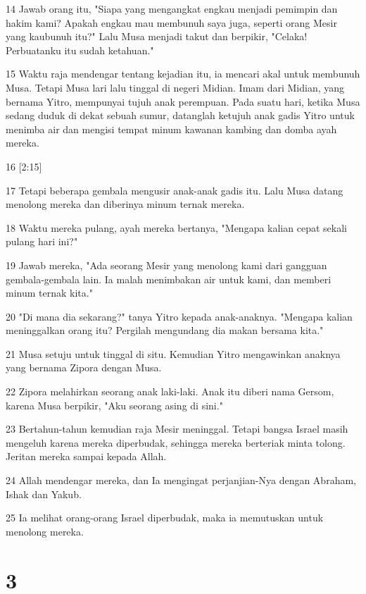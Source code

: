\par 14 Jawab orang itu, "Siapa yang mengangkat engkau menjadi pemimpin dan hakim kami? Apakah engkau mau membunuh saya juga, seperti orang Mesir yang kaubunuh itu?" Lalu Musa menjadi takut dan berpikir, "Celaka! Perbuatanku itu sudah ketahuan."
\par 15 Waktu raja mendengar tentang kejadian itu, ia mencari akal untuk membunuh Musa. Tetapi Musa lari lalu tinggal di negeri Midian. Imam dari Midian, yang bernama Yitro, mempunyai tujuh anak perempuan. Pada suatu hari, ketika Musa sedang duduk di dekat sebuah sumur, datanglah ketujuh anak gadis Yitro untuk menimba air dan mengisi tempat minum kawanan kambing dan domba ayah mereka.
\par 16 [2:15]
\par 17 Tetapi beberapa gembala mengusir anak-anak gadis itu. Lalu Musa datang menolong mereka dan diberinya minum ternak mereka.
\par 18 Waktu mereka pulang, ayah mereka bertanya, "Mengapa kalian cepat sekali pulang hari ini?"
\par 19 Jawab mereka, "Ada seorang Mesir yang menolong kami dari gangguan gembala-gembala lain. Ia malah menimbakan air untuk kami, dan memberi minum ternak kita."
\par 20 "Di mana dia sekarang?" tanya Yitro kepada anak-anaknya. "Mengapa kalian meninggalkan orang itu? Pergilah mengundang dia makan bersama kita."
\par 21 Musa setuju untuk tinggal di situ. Kemudian Yitro mengawinkan anaknya yang bernama Zipora dengan Musa.
\par 22 Zipora melahirkan seorang anak laki-laki. Anak itu diberi nama Gersom, karena Musa berpikir, "Aku seorang asing di sini."
\par 23 Bertahun-tahun kemudian raja Mesir meninggal. Tetapi bangsa Israel masih mengeluh karena mereka diperbudak, sehingga mereka berteriak minta tolong. Jeritan mereka sampai kepada Allah.
\par 24 Allah mendengar mereka, dan Ia mengingat perjanjian-Nya dengan Abraham, Ishak dan Yakub.
\par 25 Ia melihat orang-orang Israel diperbudak, maka ia memutuskan untuk menolong mereka.

\chapter{3}

